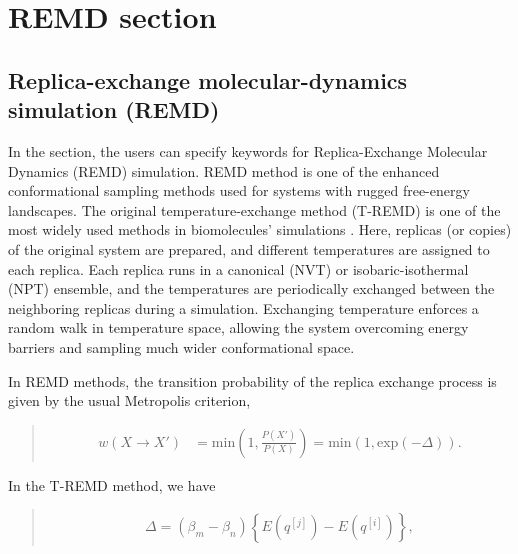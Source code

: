 \documentclass[a4paper,11pt,oneside,english]{sphinxmanual}
\begin{document}
\chapter{REMD section}
\label{\detokenize{14_REMD:remd-section}}\label{\detokenize{14_REMD:remd}}\label{\detokenize{14_REMD::doc}}

\section{Replica-exchange molecular-dynamics simulation (REMD)}
\label{\detokenize{14_REMD:replica-exchange-molecular-dynamics-simulation-remd}}
In the \sphinxstylestrong{{[}REMD{]}} section, the users can specify keywords for Replica-Exchange
Molecular Dynamics (REMD) simulation.
REMD method is one of the enhanced conformational sampling methods
used for systems with rugged free-energy landscapes.
The original temperature-exchange method (T-REMD) is one of the most
widely used methods in biomolecules’ simulations
 .
Here, replicas (or copies) of the original system are prepared,
and different temperatures are assigned to each replica.
Each replica runs in a canonical (NVT) or isobaric-isothermal (NPT)
ensemble, and the temperatures are periodically exchanged between
the neighboring replicas during a simulation.
Exchanging temperature enforces a random walk in temperature space,
allowing the system overcoming energy barriers and sampling much wider
conformational space.

In REMD methods, the transition probability of the replica exchange process is given by the usual Metropolis criterion,
\begin{quote}

\vspace{-5mm}
\begin{equation*}
\begin{split}w(X \to X') & = \mathrm{min}(1, \frac{P(X')}{P(X)}) = \mathrm{min}(1,\mathrm{exp}(-\Delta)).\end{split}
\end{equation*}
\vspace{-3mm}
\end{quote}

In the T-REMD method, we have
\begin{quote}

\vspace{-5mm}
\begin{equation*}
\begin{split}\Delta = (\beta_{m} - \beta_{n})\left\{ {E(q^{[j]}) -E(q^{[i]})} \right\},\end{split}
\end{equation*}
\vspace{-3mm}
\end{quote}
\end{document}
